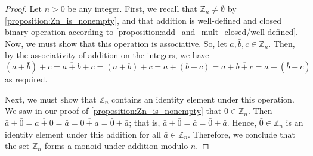 \documentclass[10pt, titlepage]{amsart}
\newcommand\Z{{\mathbb Z}}
\theoremstyle{definition}
\begin{document}
	\begin{proof}
		Let $n>0$ be any integer. 
		First, we recall that $\Z_n \neq \emptyset$ by \cref{proposition:Zn_is_nonempty}, and that addition is well-defined and closed binary operation according to \cref{proposition:add_and_mult_closed/well-defined}.
		Now, we must show that this operation is associative.
		So, let $\bar{a}, \bar{b}, \bar{c} \in \Z_n$.
		Then, by the associativity of addition on the integers, we have $$(\bar{a} + \bar{b}) + \bar{c} = \overline{a + b}  + \bar{c} = \overline{(a + b) + c} = \overline{a + (b + c)} = \bar{a} + \overline{b + c} = \bar{a} + (\bar{b} + \bar{c})$$ as required.
		
		
		
		Next, we must show that $\Z_n$ contains an identity element under this operation.
		We saw in our proof of \cref{proposition:Zn_is_nonempty} that $\bar{0} \in \Z_n$.
		Then $\bar{a} + \bar{0} = \overline{a + 0} = \bar{a} = \overline{0 + a} = \bar{0} + \bar{a}$; that is, $\bar{a} + \bar{0} =  \bar{a} = \bar{0} + \bar{a}$.
		Hence, $\bar{0} \in \Z_n$ is an identity element under this addition for all $\bar{a} \in \Z_n$.
		Therefore, we conclude that the set $\Z_n$ forms a monoid under addition modulo $n$.
	\end{proof}
	
\end{document}
